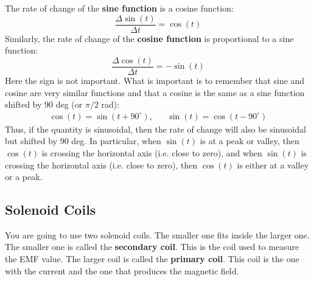 The rate of change of the \textbf{sine function} is a cosine function:
\begin{equation}
	\frac{\Delta \sin{(t)}}{\Delta t} = \cos{(t)}
\end{equation}
Similarly, the rate of change of the \textbf{cosine function} is proportional to a sine function:
\begin{equation}
	\frac{\Delta \cos{(t)}}{\Delta t} = -\sin{(t)}
\end{equation}
Here the sign is not important. What is important is to remember that sine and cosine are very similar functions and that a cosine is the same as a sine function shifted by 90 deg (or $\pi/2$ rad):
\begin{align}
	\cos{(t)} = \sin{(t + 90^{\circ})}, && \sin{(t)} = \cos{(t - 90^{\circ})}
\end{align}
Thus, if the quantity is sinusoidal, then the rate of change will also be sinusoidal but shifted by 90 deg. In particular, when $\sin{(t)}$ is at a peak or valley, then $\cos{(t)}$ is crossing the horizontal axis (i.e. close to zero), and when $\sin{(t)}$ is crossing the horizontal axis (i.e. close to zero), then $\cos{(t)}$ is either at a valley or a peak.
\subsection{Solenoid Coils}
You are going to use two solenoid coils. The smaller one fits inside the larger one. The smaller one is called the \textbf{secondary coil}. This is the coil used to measure the EMF value. The larger coil is called the \textbf{primary coil}. This coil is the one with the current and the one that produces the magnetic field.

